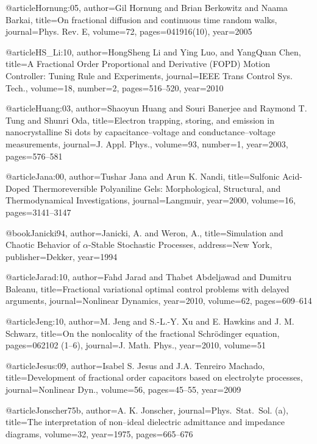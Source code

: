 \begin{thebibliography}{99}
@article{Hornung:05,
  author={Gil Hornung and Brian Berkowitz and Naama Barkai},
  title={On fractional diffusion and continuous time random walks},
  journal={Phys. Rev. E},
  volume={72},
  pages={041916(10)},
  year={2005}
}

@article{HS_Li:10,
  author={Hong{S}heng Li and Ying Luo, and Yang{Q}uan Chen},
  title={A Fractional Order Proportional and Derivative {(FOPD)} Motion Controller:
    Tuning Rule and Experiments},
  journal={IEEE Trans Control Sys. Tech.},
  volume={18},
  number={2},
  pages={516--520},
  year={2010}
}

@article{Huang:03,
  author={Shaoyun Huang and Souri Banerjee and Raymond T. Tung and Shunri Oda},
  title={Electron trapping, storing, and emission in nanocrystalline {Si} dots
    by capacitance--voltage and conductance--voltage measurements},
  journal={J. Appl. Phys.},
  volume={93},
  number={1},
  year={2003},
  pages={576--581}
}

@article{Jana:00,
  author={Tushar Jana and Arun K. Nandi},
  title={Sulfonic Acid-Doped Thermoreversible Polyaniline Gels: Morphological,
    Structural, and Thermodynamical Investigations},
  journal={Langmuir},
  year={2000},
  volume={16},
  pages={3141--3147}
}

@book{Janicki94,
  author={Janicki, A. and Weron, A.},
  title={Simulation and Chaotic Behavior of {$\alpha$}-Stable Stochastic Processes},
  address={New York},
  publisher={Dekker},
  year={1994}
}

@article{Jarad:10,
  author={Fahd Jarad and Thabet Abdeljawad and Dumitru Baleanu},
  title={Fractional variational optimal control problems with delayed arguments},
  journal={Nonlinear Dynamics},
  year={2010},
  volume={62},
  pages={609--614}
}

@article{Jeng:10,
  author={M. Jeng and {S.-L.-Y.} Xu and E. Hawkins and J. M. Schwarz},
  title={On the nonlocality of the fractional {S}chr\"{o}dinger equation},
  pages={062102 (1--6)},
  journal={J. Math. Phys.},
  year={2010},
  volume={51}
}

@article{Jesus:09,
  author={Isabel S. Jesus and J.A. Tenreiro Machado},
  title={Development of fractional order capacitors based on electrolyte processes},
  journal={Nonlinear Dyn.},
  volume={56},
  pages={45--55},
  year={2009}
}

@article{Jonscher75b,
  author={A. K. Jonscher},
  journal={Phys.\ Stat.\ Sol. (a)},
  title={The interpretation of non--ideal dielectric admittance and impedance diagrams},
  volume={32},
  year={1975},
  pages={665--676}
}


\end{thebibliography}
